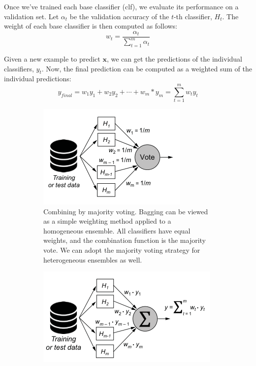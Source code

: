Once we’ve trained each base classifier (clf), we evaluate its performance on a validation set. Let $\alpha_t$ be the validation accuracy of the $t$-th classifier, $H_t$. The weight of each
base classifier is then computed as follows:
\begin{equation}
    w_t=\frac{\alpha_t}{\sum_{t=1}^m\alpha_t}
\end{equation}

Given a new example to predict $\bm{x}$, we can get the predictions of the individual classifiers, $y_t$. Now, the final prediction can be computed
as a weighted sum of the individual predictions:
\begin{equation}
    y_{final} = w_1y_1+w_2y_2+\cdots+w_m*y_m=\sum_{t=1}^{m}w_ty_t
\end{equation}

\begin{figure}
    \centering
    \begin{subfigure}[b]{.45\textwidth}
        \includegraphics[width=\textwidth]{../Figures/fig3-8.png}
        \caption{Combining by majority voting. Bagging can be viewed as a simple weighting method applied to a homogeneous ensemble. All classifiers have equal weights, and the combination function is the majority vote. We can adopt the majority voting strategy for heterogeneous ensembles as well.}
    \end{subfigure}
    \hfill
    \begin{subfigure}[b]{.45\textwidth}
        \includegraphics[width=\textwidth]{../Figures/fig3-9.png}

\end{subfigure}
\end{figure}
